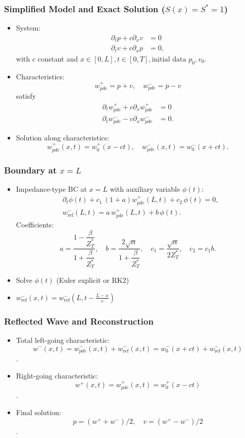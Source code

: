 \documentclass[11pt]{beamer}
\newcommand{\slideTitle}[1]{\begin{frame}\frametitle{#1}}
\begin{document}
\slideTitle{Simplified Model and Exact Solution ($S(x)= S^* =1$)}

\begin{itemize}
    \item System: 
    \begin{align}
    \partial_t p + c \partial_x v &= 0 \\
    \partial_t v + c \partial_x p &= 0,
    \end{align}
    with $c$ constant and $x \in [0,L], t \in [0,T], \text{initial data } p_0, v_0$.
    \item Characteristics: 
    $$w^+_{pde} = p+v, \quad w^-_{pde} = p-v$$ 
    satisfy
    \begin{align}
    \partial_t w^+_{pde} + c \partial_x w^+_{pde} &= 0 \\
    \partial_t w^-_{pde} - c \partial_x w^-_{pde} &= 0.
    \end{align}
    \item Solution along characteristics:
    $$w^+_{pde}(x,t) = w^+_0(x-ct), \quad w^-_{pde}(x,t) = w^-_0(x+ct).$$
\end{itemize}
\end{frame}

\slideTitle{Boundary at $x=L$}

\begin{itemize}
    \item Impedance-type BC at $x=L$ with auxiliary variable $\phi(t)$:
    \begin{align}
        &\partial_t \phi(t) + c_1\, (1+a) w^+_{pde}(L,t) + c_2\, \phi(t) = 0,\\
        &w^-_{\mathrm{ref}}(L,t) = a\, w^+_{pde}(L,t) + b\, \phi(t).
    \end{align}
    Coefficients:
    \[
    a=\frac{1-\dfrac{\beta}{Z_T^\ast}}{1+\dfrac{\beta}{Z_T^\ast}}, \quad
    b=\frac{2\sqrt{\alpha}}{1+\dfrac{\beta}{Z_T^\ast}}, \quad
    c_1=\frac{\sqrt{\alpha}}{2Z_T^\ast}, \quad
    c_2=c_1 b.
    \]
    \item Solve $\phi(t)$ (Euler explicit or RK2)
    \item $w^-_{\mathrm{ref}}(x,t)=w^-_{\mathrm{ref}}(L,t-\frac{L-x}{c})$
\end{itemize}
\end{frame}

\slideTitle{Reflected Wave and Reconstruction}

\begin{itemize}
    \item Total left-going characteristic: $$w^-(x,t)= w^-_{pde}(x,t) + w^-_\mathrm{ref}(x,t)= w^-_0(x+ct) + w^-_\mathrm{ref}(x,t)$$.
    \item Right-going characteristic: $$w^+(x,t) = w^+_{pde}(x,t) =  w^+_0(x-ct)$$.
    \item Final solution: $$p = (w^+ + w^-)/2, \quad v = (w^+ - w^-)/2$$.
\end{itemize}
\end{frame}
\end{document}
